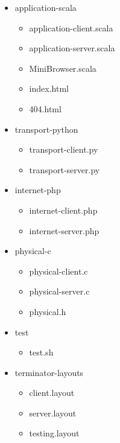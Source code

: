 \documentclass[11pt]{article}
\begin{document}
		\begin{itemize}
            \item application-scala
    		\begin{itemize}
                \item application-client.scala
                \item application-server.scala
                \item MiniBrowser.scala
                \item index.html
                \item 404.html
            \end{itemize}
            \item transport-python
    		\begin{itemize}
                \item transport-client.py
                \item transport-server.py
            \end{itemize}
            \item internet-php
    		\begin{itemize}
                \item internet-client.php
                \item internet-server.php
            \end{itemize}
            \item physical-c
    		\begin{itemize}
                \item physical-client.c
                \item physical-server.c
                \item physical.h
            \end{itemize}
            \item test
            \begin{itemize}
                \item test.sh
            \end{itemize}
            \item terminator-layouts
    		\begin{itemize}
                \item client.layout	
                \item server.layout
                \item testing.layout
            \end{itemize}
        \end{itemize}
		
\end{document}
